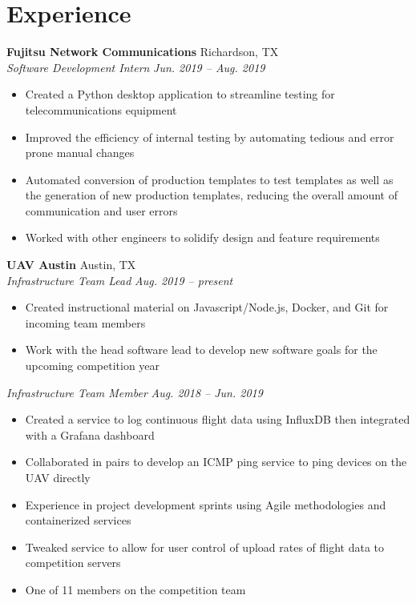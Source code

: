 \documentclass[letterpaper,11pt]{article}
\begin{document}
\section{Experience}
\textbf{Fujitsu Network Communications} \hfill Richardson, TX\\
\textit{Software Development Intern} \hfill \textit{Jun. 2019 -- Aug. 2019}\\
\begin{itemize}[noitemsep, topsep=0pt, leftmargin=0.7cm]
  \item Created a Python desktop application to streamline testing for telecommunications equipment
  \item Improved the efficiency of internal testing by automating tedious and error prone manual changes
  \item Automated conversion of production templates to test templates as well as the generation of new production templates, reducing the overall amount of communication and user errors
  \item Worked with other engineers to solidify design and feature requirements %
\end{itemize}
\textbf{UAV Austin} \hfill Austin, TX\\
\textit{Infrastructure Team Lead} \hfill \textit{Aug. 2019 -- present}\\
\begin{itemize}[noitemsep, topsep=0pt, leftmargin=0.7cm]
  \item Created instructional material on Javascript/Node.js, Docker, and Git for incoming team members
  \item Work with the head software lead to develop new software goals for the upcoming competition year
\end{itemize}
\textit{Infrastructure Team Member} \hfill \textit{Aug. 2018 -- Jun. 2019}\\
\begin{itemize}[noitemsep, topsep=0pt, leftmargin=0.7cm]
  \item Created a service to log continuous flight data using InfluxDB then integrated with a Grafana dashboard
  \item Collaborated in pairs to develop an ICMP ping service to ping devices on the UAV directly
  \item Experience in project development sprints using Agile methodologies and containerized services 
  \item Tweaked service to allow for user control of upload rates of flight data to competition servers %
  \item One of 11 members on the competition team %
\end{itemize}
\end{document}
